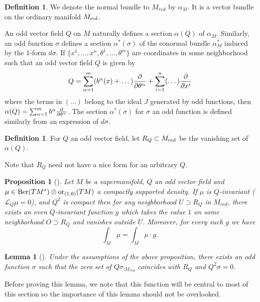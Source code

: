 \documentclass[11pt]{amsart}
\numberwithin{equation}{section}
\numberwithin{figure}{section}
\theoremstyle{plain}
\newtheorem{prop}[thm]{Proposition}
\newtheorem{lem}[thm]{Lemma}
\theoremstyle{definition}
\newtheorem{defn}[thm]{Definition}
\theoremstyle{remark}
\begin{document}
\begin{defn}
We denote the normal bundle to $M_{red}$ by $\alpha_{M}$. It is
a vector bundle on the ordinary manifold $M_{\mathrm{red}}$.
\end{defn}
An odd vector field $Q$ on $M$ naturally defines a section $\alpha(Q)$
of $\alpha_{M}$. Similarly, an odd function $\sigma$ defines a section
$\alpha^{*}(\sigma)$ of the conormal bundle $\alpha_{M}^{*}$ induced
by the 1-form $d\sigma$. If $\{x^{1},\dots,x^{n},\theta^{1},\dots,\theta^{m}\}$
are coordinates in some neighborhood such that an odd vector field
$Q$ is given by 
\[
Q=\sum_{\alpha=1}^{m}(b^{\alpha}(x)+\dots)\frac{\partial}{\partial\theta^{\alpha}}+\sum_{i=1}^{n}(\dots)\frac{\partial}{\partial x^{i}}
\]
where the terms in $(\dots)$ belong to the ideal $J$ generated by
odd functions, then $\alpha(Q)=\sum_{\alpha=1}^{m}b^{\alpha}\frac{\partial}{\partial\theta^{\alpha}}$.
The section $\alpha^{*}(\sigma)$ for $\sigma$ an odd function is
defined similarly from an expression of $d\sigma$.
\begin{defn}
For $Q$ an odd vector field, let $R_{Q}\subset M_{\mathrm{red}}$ be the
vanishing set of $\alpha(Q)$.
\end{defn}
Note that $R_{Q}$ need not have a nice form for an arbitrary $Q$.
\begin{prop}[{\cite[Theorem 1]{SuppersymmetryAndLocalization}}]
\label{prop:general_localization_theorem}Let $M$ be a supermanifold,
$Q$ an odd vector field and $\mu\in\mathrm{Ber}(TM^{*})\otimes\mathrm{or}_{(1,0)}(TM)$
a compactly supported density. If $\mu$ is $Q$-invariant ($\mathcal{L}_{Q}\mu=0$),
and $Q^{2}$ is compact then for any neighborhood $U\supset R_{Q}$
in $M_{red}$, there exists an even $Q$-invariant function $g$ which
takes the value $1$ on some neighborhood $O\supset R_{Q}$ and vanishes
outside $U$. Moreover, for every such $g$ we have 
\[
\int_{M}\mu=\int_{M}\mu\cdot g.
\]
\end{prop}
\begin{lem}[{\cite[Lemma 1]{SuppersymmetryAndLocalization}}]
\label{lem:sigma_function}Under the assumptions of the above proposition,
there exists an odd function $\sigma$ such that the zero set of $Q\sigma_{|M_{red}}$
coincides with $R_{Q}$ and $Q^{2}\sigma=0$.
\end{lem}
Before proving this lemma, we note that this function will be central
to most of this section so the importance of this lemma should not
be overlooked. 
\end{document}
